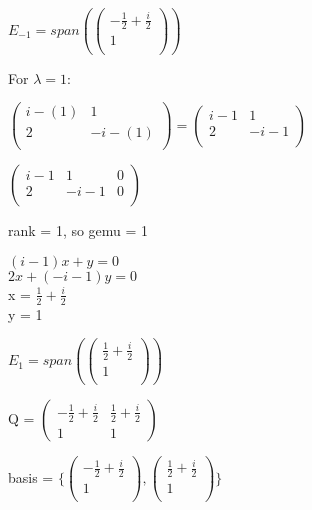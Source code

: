 \documentclass[12pt]{article}
\begin{document}
\begin{enumerate}
\begin{enumerate}[label=(\alph*)]
            $E_{-1} =  span(\begin{pmatrix}
                -\frac{1}{2} + \frac{i}{2} \\
                1 \\
            \end{pmatrix})$

             For $\lambda  = 1$: 

            $\begin{pmatrix}
                i - (1) & 1 \\
                2 & -i - (1) \\
            \end{pmatrix} = \begin{pmatrix}
                i - 1 & 1 \\
                2 & -i - 1 \\
            \end{pmatrix}$

            $\begin{pmatrix}
                i - 1 & 1 & 0 \\
                2 & -i - 1 & 0 \\
            \end{pmatrix}$

            rank = 1, so gemu = 1

            $(i - 1)x + y = 0$ \\
            $2x + (-i - 1)y = 0$ \\ 

            x = $\frac{1}{2} + \frac{i}{2}$ \\
            y = 1
            
            $E_1 = span(\begin{pmatrix}
                \frac{1}{2} + \frac{i}{2} \\
                1 \\
            \end{pmatrix})$

            Q = $\begin{pmatrix}
                -\frac{1}{2} + \frac{i}{2} & \frac{1}{2} + \frac{i}{2} \\
                1 & 1
            \end{pmatrix}$

            basis = $ \{\begin{pmatrix}
                -\frac{1}{2} + \frac{i}{2} \\
                1 \\
            \end{pmatrix}, \begin{pmatrix}
                \frac{1}{2} + \frac{i}{2} \\
                1 \\
            \end{pmatrix} \}$
            

\end{enumerate}
\end{enumerate}
\end{document}
